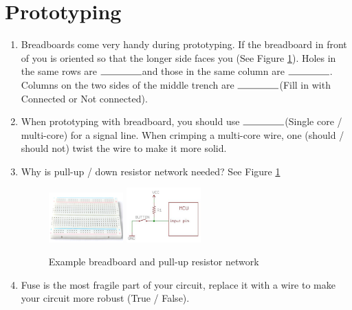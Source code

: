 \documentclass{article}
\newcommand{\ans}{$\rule{1.5cm}{0.15mm}$}
\begin{document}
\section{Prototyping}
\begin{enumerate}
	\item Breadboards come very handy during prototyping. If the breadboard in front of you is oriented so that the longer side faces you (See Figure \ref{fig:bread}). Holes in the same rows are \ans and those in the same column are \ans. Columns on the two sides of the middle trench are \ans (Fill in with Connected or Not connected). 
	\item When prototyping with breadboard, you should use \ans (Single core / multi-core) for a signal line. When crimping a multi-core wire, one (should / should not) twist the wire to make it more solid. 
	\item Why is pull-up / down resistor network needed? See Figure \ref{fig:bread}
	\begin{figure}[!h]
		\center
		\includegraphics[width=0.27\textwidth, keepaspectratio]{bread}
		\includegraphics[width=0.27\textwidth, keepaspectratio]{pull}
		\caption{Example breadboard and pull-up resistor network}
		\label{fig:bread}
	\end{figure}
	\item Fuse is the most fragile part of your circuit, replace it with a wire to make your circuit more robust (True / False).
	
\end{enumerate}
\end{document}
